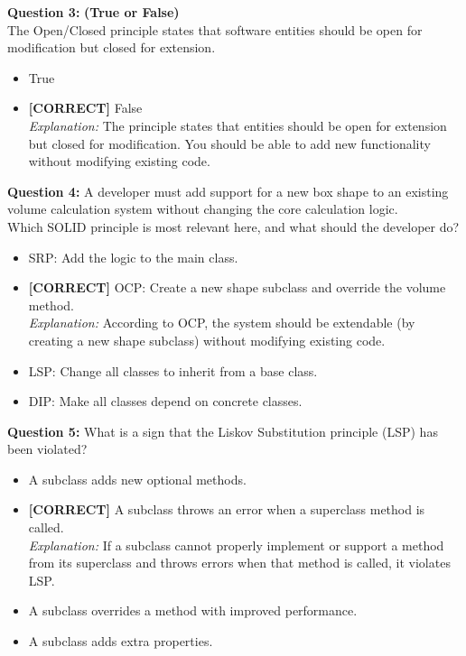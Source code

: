 \vspace{0.3cm}
\noindent
\textbf{Question 3:} \textbf{(True or False)}
\\
The Open/Closed principle states that software entities should be open for modification but closed for extension.
\\[0.2cm]
\begin{itemize}
 \item True
 \item \textbf{[CORRECT]} False
\\[0.1cm]
\textit{Explanation:} 
The principle states that entities should be open for extension but closed for modification. You should be able to add new functionality without modifying existing code.
\end{itemize}
\vspace{0.3cm}
\noindent
\textbf{Question 4:} A developer must add support for a new box shape to an existing volume calculation system without changing the core calculation logic.
\\
Which SOLID principle is most relevant here, and what should the developer do?
\\[0.2cm]
\begin{itemize}
 \item SRP: Add the logic to the main class.
 \item \textbf{[CORRECT]} OCP: Create a new shape subclass and override the volume method.
\\[0.1cm]
\textit{Explanation:} 
According to OCP, the system should be extendable (by creating a new shape subclass) without modifying existing code.
 \item LSP: Change all classes to inherit from a base class.
 \item DIP: Make all classes depend on concrete classes.
\end{itemize}
\vspace{0.3cm}
\noindent
\textbf{Question 5:} What is a sign that the Liskov Substitution principle (LSP) has been violated?
\\[0.2cm]
\begin{itemize}
 \item A subclass adds new optional methods.
 \item \textbf{[CORRECT]} A subclass throws an error when a superclass method is called.
\\[0.1cm]
\textit{Explanation:} 
If a subclass cannot properly implement or support a method from its superclass and throws errors when that method is called, it violates LSP.
 \item A subclass overrides a method with improved performance.
 \item A subclass adds extra properties.
\end{itemize}
